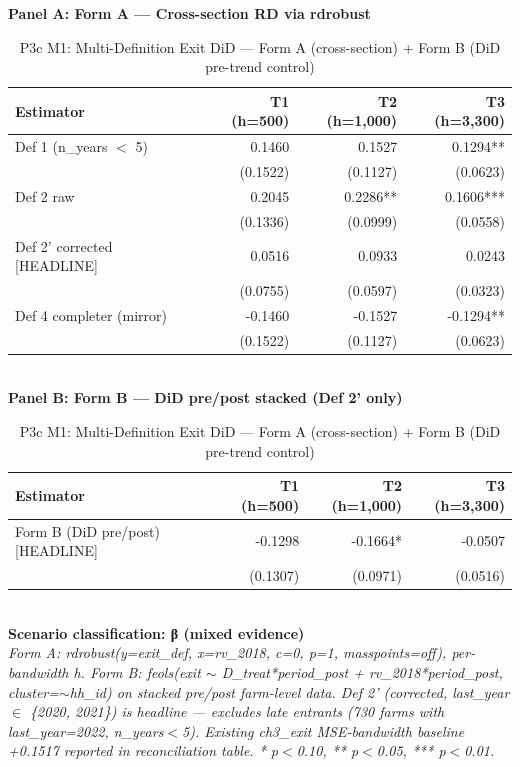 \begin{table}[t]
\centering
\caption{P3c M1: Multi-Definition Exit DiD — Form A (cross-section) + Form B (DiD pre-trend control)}
\label{tab:ch5_exit_definitions_en}
\textbf{Panel A: Form A — Cross-section RD via rdrobust}\\
\begin{tabular}{lrrr}
\toprule
Estimator & T1 (h=500) & T2 (h=1,000) & T3 (h=3,300) \\
\midrule
Def 1 (n_years $<$ 5) & 0.1460 & 0.1527 & 0.1294** \\
       & (0.1522) & (0.1127) & (0.0623) \\
Def 2 raw & 0.2045 & 0.2286** & 0.1606*** \\
       & (0.1336) & (0.0999) & (0.0558) \\
Def 2' corrected [HEADLINE] & 0.0516 & 0.0933 & 0.0243 \\
       & (0.0755) & (0.0597) & (0.0323) \\
Def 4 completer (mirror) & -0.1460 & -0.1527 & -0.1294** \\
       & (0.1522) & (0.1127) & (0.0623) \\
\bottomrule
\end{tabular}\\[1ex]
\textbf{Panel B: Form B — DiD pre/post stacked (Def 2' only)}\\
\begin{tabular}{lrrr}
\toprule
Estimator & T1 (h=500) & T2 (h=1,000) & T3 (h=3,300) \\
\midrule
Form B (DiD pre/post) [HEADLINE] & -0.1298 & -0.1664* & -0.0507 \\
                                  & (0.1307) & (0.0971) & (0.0516) \\
\bottomrule
\end{tabular}\\[1ex]
\textbf{Scenario classification: β (mixed evidence)}\\
\footnotesize\textit{Form A: rdrobust(y=exit\_def, x=rv\_2018, c=0, p=1, masspoints=off), per-bandwidth h. Form B: feols(exit $\sim$ D\_treat*period\_post + rv\_2018*period\_post, cluster=$\sim$hh\_id) on stacked pre/post farm-level data. Def 2' (corrected, last\_year $\in$ \{2020, 2021\}) is headline — excludes late entrants (730 farms with last\_year=2022, n\_years$<$5). Existing ch3\_exit MSE-bandwidth baseline +0.1517 reported in reconciliation table. * p$<$0.10, ** p$<$0.05, *** p$<$0.01.}
\end{table}

